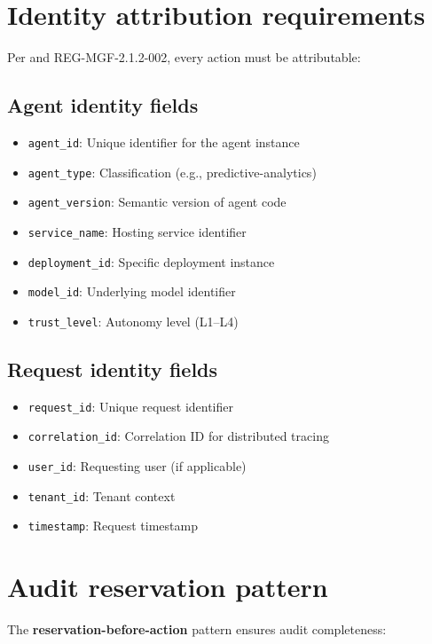 \section{Identity attribution requirements}

Per  and REG-MGF-2.1.2-002, every action must be attributable:

\subsection{Agent identity fields}

\begin{itemize}
  \item \texttt{agent\_id}: Unique identifier for the agent instance
  \item \texttt{agent\_type}: Classification (e.g., predictive-analytics)
  \item \texttt{agent\_version}: Semantic version of agent code
  \item \texttt{service\_name}: Hosting service identifier
  \item \texttt{deployment\_id}: Specific deployment instance
  \item \texttt{model\_id}: Underlying model identifier
  \item \texttt{trust\_level}: Autonomy level (L1--L4)
\end{itemize}

\subsection{Request identity fields}

\begin{itemize}
  \item \texttt{request\_id}: Unique request identifier
  \item \texttt{correlation\_id}: Correlation ID for distributed tracing
  \item \texttt{user\_id}: Requesting user (if applicable)
  \item \texttt{tenant\_id}: Tenant context
  \item \texttt{timestamp}: Request timestamp
\end{itemize}

\section{Audit reservation pattern}

The \textbf{reservation-before-action} pattern ensures audit completeness:


